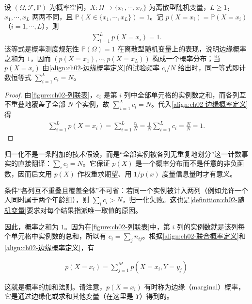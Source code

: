 \documentclass[../../main.tex]{subfiles}
\begin{document}
\begin{proposition}[边缘概率的归一化]\label{proposition:ch02-边缘概率归一化}
设 $(\Omega,\mathcal{F},\mathbb{P})$ 为概率空间，$X:\Omega\to\{x_1,\cdots,x_L\}$ 为离散型随机变量，$L\geqslant1$，$x_1,\cdots,x_L$ 两两不同，且 $\mathbb{P}(X\in\{x_1,\cdots,x_L\})=1$。记 $p(X=x_i)=\mathbb{P}(X=x_i)$（$i=1,\cdots,L$），则
\begin{align*}
  \sum_{i=1}^{L}p(X=x_i)=1 .
\end{align*}
该等式是概率测度规范性 $\mathbb{P}(\Omega)=1$ 在离散型随机变量上的表现，说明边缘概率之和为 $1$，因而 $(p(X=x_1),\cdots,p(X=x_L))$ 构成一个概率分布；当 $p(X=x_i)$ 由\eqref{align:ch02-边缘概率定义}的试验频率 $c_i/N$ 给出时，同一等式即计数恒等式 $\sum_{i=1}^{L}c_i=N$。
\end{proposition}

\begin{proof}
由\cref{figure:ch02-列联表}，$c_i$ 是第 $i$ 列中全部单元格的实例数之和，而各列互不重叠地覆盖了全部 $N$ 个实例，故 $\sum_{i=1}^{L}c_i=N$。代入\eqref{align:ch02-边缘概率定义}得
\begin{align*}
 \sum_{i=1}^{L} p(X=x_i) = \sum_{i=1}^{L}\frac{c_i}{N} = \frac{1}{N}\sum_{i=1}^{L}c_i = \frac{N}{N} = 1 .
\end{align*}
\end{proof}

\begin{remark}
归一化不是一条附加的技术假设，而是“全部实例被各列无重复地划分”这一计数事实的直接翻译：$\sum_i c_i=N$。它保证 $p(X)$ 是一个概率分布而不是任意的非负函数，因而后文用 $p(X)$ 作权重求期望、用 $1/p(x)$ 度量信息量时才有意义。

条件“各列互不重叠且覆盖全体”不可省：若同一个实例被计入两列（例如允许一个人同时属于两个年龄组），则 $\sum_i c_i>N$，归一化失败。这也是\cref{definition:ch02-随机变量}要求对每个结果指派唯一取值的原因。
\end{remark}

因此，概率之和为 $1$。因为在\cref{figure:ch02-列联表}中，第 $i$ 列的实例数就是该列每个单元格中实例数的总和，所以有 $c_i=\sum_j n_{ij}$。根据\eqref{align:ch02-联合概率定义}和\eqref{align:ch02-边缘概率定义}，有

\begin{align}
  p(X=x_i) = \sum_{j=1}^{M} p(X=x_i,Y=y_j)
  \label{align:ch02-加和法则离散}
\end{align}

这就是概率的加和法则。请注意，$p(X=x_i)$ 有时称为边缘（marginal）概率，它是通过边缘化或求和其他变量（在这里是 $Y$）得到的。
\end{document}
